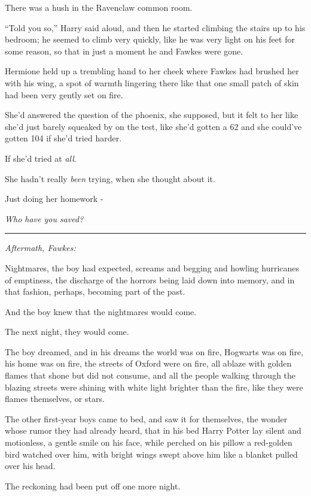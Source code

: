 There was a hush in the Ravenclaw common room.

``Told you so,'' Harry said aloud, and then he started climbing the stairs up to his bedroom; he seemed to climb very quickly, like he was very light on his feet for some reason, so that in just a moment he and Fawkes were gone.

Hermione held up a trembling hand to her cheek where Fawkes had brushed her with his wing, a spot of warmth lingering there like that one small patch of skin had been very gently set on fire.

She'd answered the question of the phoenix, she supposed, but it felt to her like she'd just barely squeaked by on the test, like she'd gotten a 62 and she could've gotten 104 if she'd tried harder.

If she'd tried at \emph{all}.

She hadn't really \emph{been} trying, when she thought about it.

Just doing her homework -

\emph{Who have you saved?}

\begin{center}\rule{3in}{0.4pt}\end{center}

\emph{Aftermath, Fawkes:}

Nightmares, the boy had expected, screams and begging and howling hurricanes of emptiness, the discharge of the horrors being laid down into memory, and in that fashion, perhaps, becoming part of the past.

And the boy knew that the nightmares would come.

The next night, they would come.

The boy dreamed, and in his dreams the world was on fire, Hogwarts was on fire, his home was on fire, the streets of Oxford were on fire, all ablaze with golden flames that shone but did not consume, and all the people walking through the blazing streets were shining with white light brighter than the fire, like they were flames themselves, or stars.

The other first-year boys came to bed, and saw it for themselves, the wonder whose rumor they had already heard, that in his bed Harry Potter lay silent and motionless, a gentle smile on his face, while perched on his pillow a red-golden bird watched over him, with bright wings swept above him like a blanket pulled over his head.

The reckoning had been put off one more night.

